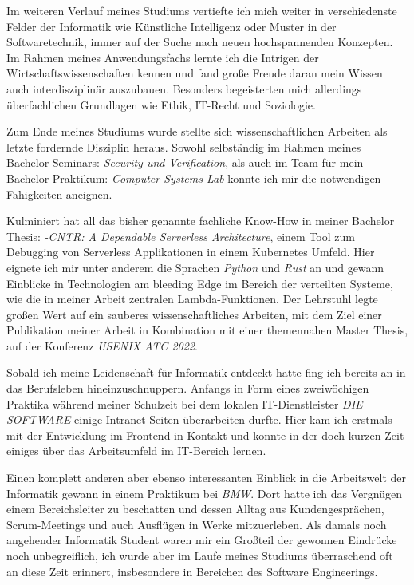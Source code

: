 \documentclass[11pt, a4paper]{awesome-cv}
\begin{document}
\begin{cvletter}
  Im weiteren Verlauf meines Studiums vertiefte ich mich weiter in verschiedenste Felder der Informatik wie Künstliche Intelligenz oder Muster in der Softwaretechnik, immer auf der Suche nach neuen hochspannenden Konzepten. Im Rahmen meines Anwendungsfachs lernte ich die Intrigen der Wirtschaftswissenschaften kennen und fand große Freude daran mein Wissen auch interdisziplinär auszubauen. Besonders begeisterten mich allerdings überfachlichen Grundlagen wie Ethik, IT-Recht und Soziologie.


  Zum Ende meines Studiums wurde stellte sich wissenschaftlichen Arbeiten als letzte fordernde Disziplin heraus. Sowohl selbständig im Rahmen meines Bachelor-Seminars: \textit{Security und Verification}, als auch im Team für mein Bachelor Praktikum: \textit{Computer Systems Lab} konnte ich mir die notwendigen Fahigkeiten aneignen.


  Kulminiert hat all das bisher genannte fachliche Know-How in meiner Bachelor Thesis:  \textit{\lambda-CNTR: A Dependable Serverless Architecture}, einem Tool zum Debugging von Serverless Applikationen in einem Kubernetes Umfeld. Hier eignete ich mir unter anderem die Sprachen \textit{Python} und \textit{Rust} an und gewann Einblicke in Technologien am bleeding Edge im Bereich der verteilten Systeme, wie die in meiner Arbeit zentralen Lambda-Funktionen.
  Der Lehrstuhl legte großen Wert auf ein sauberes wissenschaftliches Arbeiten, mit dem Ziel einer Publikation meiner Arbeit in Kombination mit einer themennahen Master Thesis, auf der Konferenz \textit{USENIX ATC 2022}.


  Sobald ich meine Leidenschaft für Informatik entdeckt hatte fing ich bereits an in das Berufsleben hineinzuschnuppern. Anfangs in Form eines zweiwöchigen Praktika während meiner Schulzeit bei dem lokalen IT-Dienstleister \textit{DIE SOFTWARE} einige Intranet Seiten überarbeiten durfte. Hier kam ich erstmals mit der Entwicklung im Frontend in Kontakt und konnte in der doch kurzen Zeit einiges über das Arbeitsumfeld im IT-Bereich lernen.

  Einen komplett anderen aber ebenso interessanten Einblick in die Arbeitswelt der Informatik gewann in einem Praktikum bei \textit{BMW}. Dort hatte ich das Vergnügen einem Bereichsleiter zu beschatten und dessen Alltag aus Kundengesprächen, Scrum-Meetings und auch Ausflügen in Werke mitzuerleben. Als damals noch angehender Informatik Student waren mir ein Großteil der gewonnen Eindrücke noch unbegreiflich, ich wurde aber im Laufe meines Studiums überraschend oft an diese Zeit erinnert, insbesondere in Bereichen des Software Engineerings.


\end{cvletter}
\end{document}

